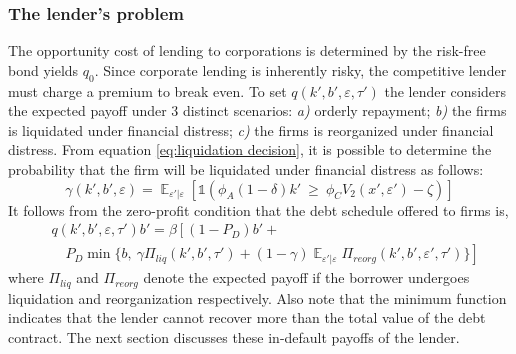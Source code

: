 \documentclass[12pt]{article}
\DeclareMathOperator{\E}{\mathbb{E}}
\begin{document}
\subsubsection{The lender's problem}
The opportunity cost of lending to corporations is determined by the risk-free bond yields $q_0$. Since corporate lending is inherently risky, the competitive lender must charge a premium to break even. To set $q(k',b',\varepsilon, \tau')$ the lender considers the expected payoff under 3 distinct scenarios: \textit{a)} orderly repayment; \textit{b)} the firms is liquidated under financial distress; \textit{c)} the firms is reorganized under financial distress. From equation \ref{eq:liquidation decision}, it is possible to determine the probability that the firm will be liquidated under financial distress as follows: 
\begin{equation} \label{eq:liquidation probability}
    \gamma(k',b',\varepsilon) = \E_{\varepsilon'|\varepsilon}[\mathds{1}(\phi_A (1-\delta) k'  \  \geq \ \phi_C V_2(x',\varepsilon')- \zeta)]  
\end{equation}
It follows from the zero-profit condition that the debt schedule offered to firms is, 
\begin{equation} \label{eq:q}
    \begin{split}
        & q(k',b', \varepsilon, \tau')b' =  \beta \left[ (1-P_D)b' + \right. \\
        & \quad P_D \min \{b, \ \gamma \Pi_{liq}(k',b', \tau') +  \left. (1-\gamma) \E_{\varepsilon'|\varepsilon} \Pi_{reorg}(k',b', \varepsilon', \tau') \} \right] 
    \end{split}
 \end{equation}
where $\Pi_{liq}$ and $\Pi_{reorg}$ denote the expected payoff if the borrower undergoes liquidation and reorganization respectively. Also note that the minimum function indicates that the lender cannot recover more than the total value of the debt contract.  The next section discusses these in-default payoffs of the lender. 
\end{document}
